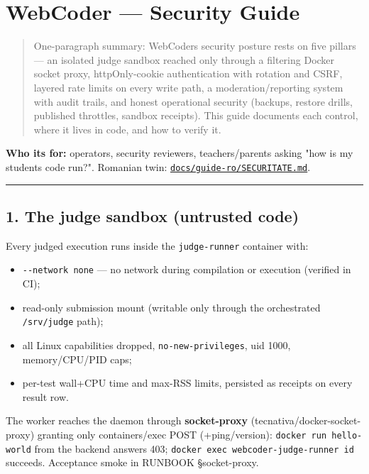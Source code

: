 \documentclass[
]{article}
\author{}
\date{}
\newcounter{none} %
\providecommand{\tightlist}{%
  \setlength{\itemsep}{0pt}\setlength{\parskip}{0pt}}
\begin{document}
{
\setcounter{tocdepth}{2}
\tableofcontents
}
\section{WebCoder --- Security Guide}\label{webcoder--security-guide}

\begin{quote}
One-paragraph summary: WebCoder\textquotesingle s security posture rests
on five pillars --- an isolated judge sandbox reached only through a
filtering Docker socket proxy, httpOnly-cookie authentication with
rotation and CSRF, layered rate limits on every write path, a
moderation/reporting system with audit trails, and honest operational
security (backups, restore drills, published throttles, sandbox
receipts). This guide documents each control, where it lives in code,
and how to verify it.
\end{quote}

\textbf{Who it\textquotesingle s for:} operators, security reviewers,
teachers/parents asking "how is my student\textquotesingle s code run?".
Romanian twin:
\href{../guide-ro/SECURITATE.md}{\texttt{docs/guide-ro/SECURITATE.md}}.

\begin{center}\rule{0.5\linewidth}{0.5pt}\end{center}

\subsection{1. The judge sandbox (untrusted
code)}\label{1-the-judge-sandbox-untrusted-code}

Every judged execution runs inside the \texttt{judge-runner} container
with:

\begin{itemize}
\tightlist
\item
  \texttt{-\/-network\ none} --- no network during compilation or
  execution (verified in CI);
\item
  read-only submission mount (writable only through the orchestrated
  \texttt{/srv/judge} path);
\item
  all Linux capabilities dropped, \texttt{no-new-privileges}, uid 1000,
  memory/CPU/PID caps;
\item
  per-test wall+CPU time and max-RSS limits, persisted as receipts on
  every result row.
\end{itemize}

The worker reaches the daemon through \textbf{socket-proxy}
(tecnativa/docker-socket-proxy) granting only containers/exec POST
(+ping/version): \texttt{docker\ run\ hello-world} from the backend
answers 403; \texttt{docker\ exec\ webcoder-judge-runner\ id} succeeds.
Acceptance smoke in RUNBOOK §socket-proxy.
\end{document}
